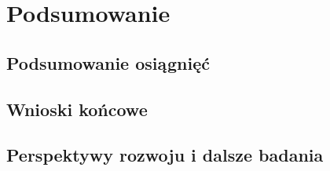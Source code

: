 \chapter{Podsumowanie}
\section{Podsumowanie osiągnięć}
\section{Wnioski końcowe}
\section{Perspektywy rozwoju i dalsze badania}